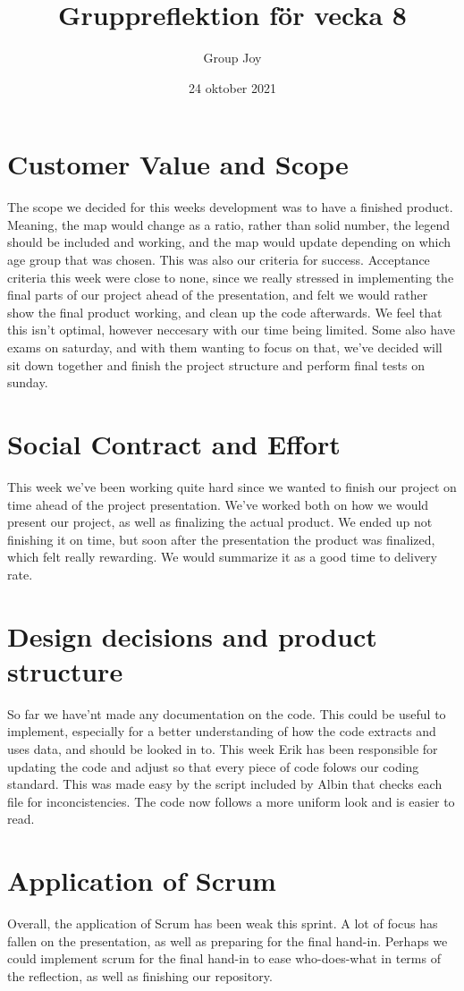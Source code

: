 \documentclass{scrartcl}
\begin{document}
\title{Gruppreflektion för vecka 8}
\author{Group Joy}
\date{24 oktober 2021}
\maketitle

\section{Customer Value and Scope}
The scope we decided for this weeks development was to have a finished product. Meaning, the map would change as a ratio, rather than solid number, the legend should be included and working, and the map would update depending on which age group that was chosen. This was also our criteria for success. Acceptance criteria this week were close to none, since we really stressed in implementing the final parts of our project ahead of the presentation, and felt we would rather show the final product working, and clean up the code afterwards. We feel that this isn't optimal, however neccesary with our time being limited. Some also have exams on saturday, and with them wanting to focus on that, we've decided will sit down together and finish the project structure and perform final tests on sunday.

\section{Social Contract and Effort}
This week we've been working quite hard since we wanted to finish our project on time ahead of the project presentation. We've worked both on how we would present our project, as well as finalizing the actual product. We ended up not finishing it on time, but soon after the presentation the product was finalized, which felt really rewarding. We would summarize it as a good time to delivery rate.

\section{Design decisions and product structure}
So far we have'nt made any documentation on the code. This could be useful to implement, especially for a better understanding of how the code extracts and uses data, and should be looked in to. \newline
This week Erik has been responsible for updating the code and adjust so that every piece of code folows our coding standard. This was made easy by the script included by Albin that checks each file for inconcistencies. The code now follows a more uniform look and is easier to read. 

\section{Application of Scrum}
Overall, the application of Scrum has been weak this sprint. A lot of focus has fallen on the presentation, as well as preparing for the final hand-in. Perhaps we could implement scrum for the final hand-in to ease who-does-what in terms of the reflection, as well as finishing our repository.
\end{document}
